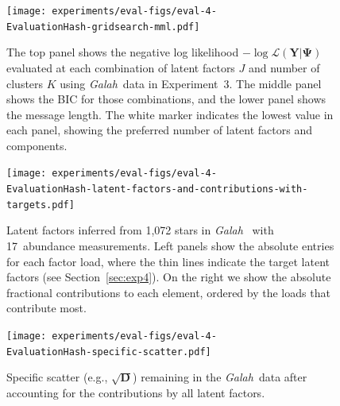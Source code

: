\documentclass[twocolumn]{aastex62}
\newcommand{\project}[1]{\textsl{#1}}
\newcommand{\Galah}{\project{Galah}}
\newcommand{\vect}[1]{\boldsymbol{\mathbf{#1}}}
\renewcommand{\vec}[1]{\vect{#1}}
\newcommand{\data}{\textbf{Y}}
\newcommand{\specificvariance}{\vec{D}}
\newcommand{\NumLatentFactors}{J}
\newcommand{\NumComponents}{K}
\newcommand{\ExperimentHash}{89dab}
\newcommand{\EvaluationHash}{c7d68}
\newcommand{\ExpThreeNumAbundances}{17}
\begin{document}
\begin{figure}

	\texttt{[image: experiments/eval-figs/eval-4-\\EvaluationHash-gridsearch-mml.pdf]}
    \caption{The top panel shows the negative log likelihood 
			 $-\log{\mathcal{L}\left(\data|\vec\Psi\right)}$ 
			 evaluated at each combination of latent factors 
			 $\NumLatentFactors$ and number of clusters 
			 $\NumComponents$ using \Galah\ data in
			 Experiment~3.  The middle panel shows 
			 the BIC for those combinations, and the lower panel shows the 
			 message length. The white marker indicates the
			 lowest value in each panel, showing the
			 preferred number of latent factors and components.}
    \label{fig:exp3-gridsearch}
\end{figure}

\begin{figure}
	\texttt{[image: experiments/eval-figs/eval-4-\\EvaluationHash-latent-factors-and-contributions-with-targets.pdf]}
	\caption{Latent factors inferred from 1,072 stars in \Galah\
			 \citep[][thick lines]{Buder:2018} with \ExpThreeNumAbundances\ abundance measurements. Left panels show the absolute entries for each
			 factor load, where the thin lines indicate the target latent factors (see Section~\ref{sec:exp4}). On the right we show the absolute fractional contributions
			 to each element, ordered by the loads that contribute most.}
    \label{fig:exp3-factor-loads}
\end{figure}


\begin{figure}
	\texttt{[image: experiments/eval-figs/eval-4-\\EvaluationHash-specific-scatter.pdf]}
	\caption{Specific scatter (e.g., $\sqrt{\specificvariance}$) remaining in the \Galah\ data \citep{Buder:2018}
			 after accounting for the contributions by all
			 latent factors.}
    \label{fig:exp3-specific-scatter}
\end{figure}
\end{document}
